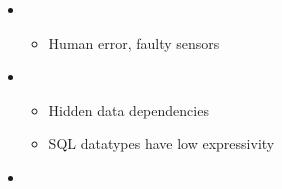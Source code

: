 \begin{block}{}
  \begin{itemize}
  \item {}
    \begin{itemize}
    \item Human error, faulty sensors
    \end{itemize}
  \item {}
    \begin{itemize}
    \item Hidden data dependencies
    \item SQL datatypes have low expressivity
    \end{itemize}
  \item {}
  \end{itemize}
\end{block}
